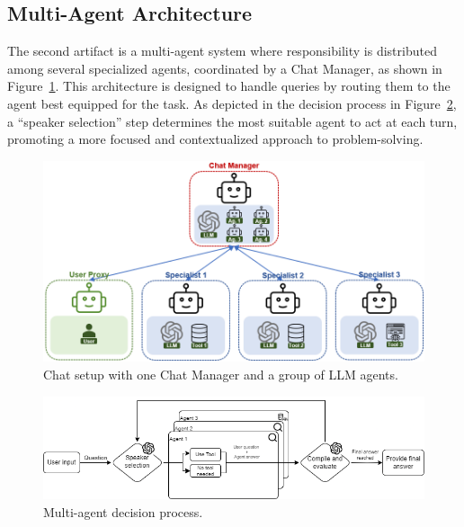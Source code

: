         \subsection{Multi-Agent Architecture}

            The second artifact is a multi-agent system where responsibility is distributed among several specialized agents, coordinated by a Chat Manager, as shown in Figure~\ref{fig:agent_config_2}. This architecture is designed to handle queries by routing them to the agent best equipped for the task. As depicted in the decision process in Figure~\ref{fig:diagrama_agente_MultiAgente_2}, a \enquote{speaker selection} step determines the most suitable agent to act at each turn, promoting a more focused and contextualized approach to problem-solving.

            \begin{figure}[h]
                \centering
                \includegraphics[width=.75\textwidth]{images/agent_config_2.png}
                \caption{Chat setup with one Chat Manager and a group of LLM agents.}
                \label{fig:agent_config_2}
            \end{figure}
            
            \begin{figure}[h]
                \centering
                \includegraphics[width=1\textwidth]{images/agent_diagram_2.png}
                \caption{Multi-agent decision process.}
                \label{fig:diagrama_agente_MultiAgente_2}
            \end{figure}

